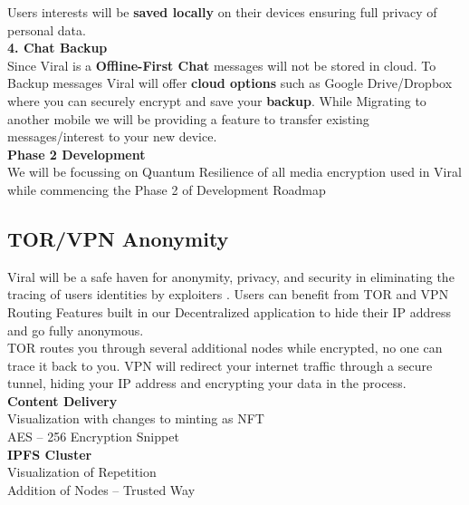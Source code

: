 \documentclass[10pt]{article}
\begin{document}
Users\textsc{} interests will be \textbf{saved locally} on their devices ensuring full privacy of personal data.\\

\textbf{4. Chat Backup}\\

Since Viral is a \textbf{Offline-First Chat} messages will not be stored in cloud. To Backup messages Viral will offer \textbf{cloud options} such as Google Drive/Dropbox where you can securely encrypt and save your \textbf{backup}. While Migrating to another mobile we will be providing a feature to transfer existing messages/interest to your new device.\\

\textbf{Phase 2 Development}\\

We will be focussing on Quantum Resilience of all media encryption used in Viral while commencing the Phase 2 of Development Roadmap\\

\subsection{TOR/VPN Anonymity}

Viral will be a safe haven for anonymity, privacy, and security in eliminating the tracing of users\textsc{} identities by exploiters . Users can benefit from TOR and VPN Routing Features built in our Decentralized application to hide their IP address and go fully anonymous.\\

TOR routes you through several additional nodes while encrypted, no one can trace it back to you. VPN will redirect your internet traffic through a secure tunnel, hiding your IP address and encrypting your data in the process.\\

\textbf{Content Delivery}\\

Visualization with changes to minting as NFT\\

AES – 256 Encryption Snippet\\

\textbf{IPFS Cluster}\\

Visualization of Repetition\\

Addition of Nodes – Trusted Way\\
\end{document}
